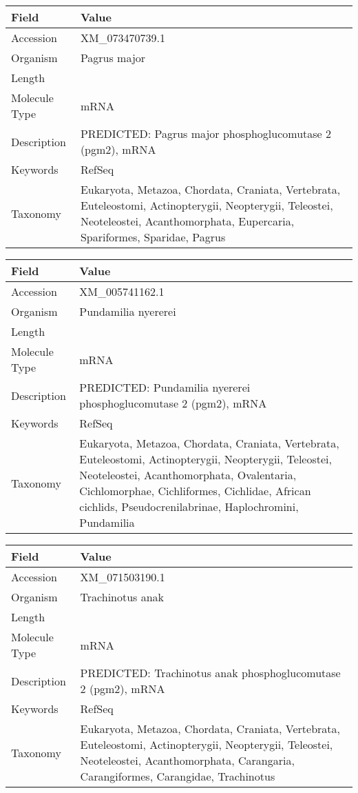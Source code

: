 \documentclass[10pt]{article}
\begin{document}
{\footnotesize
\begin{longtable}{>{\raggedright\arraybackslash}p{4.5cm} >{\raggedright\arraybackslash}p{11.5cm}}
\textbf{Field} & \textbf{Value} \\
\hline
Accession & XM\_073470739.1 \\
Organism & Pagrus major \\
Length & 2910 \\
Molecule Type & mRNA \\
Description & PREDICTED: Pagrus major phosphoglucomutase 2 (pgm2), mRNA \\
Keywords & RefSeq \\
Taxonomy & Eukaryota, Metazoa, Chordata, Craniata, Vertebrata, Euteleostomi, Actinopterygii, Neopterygii, Teleostei, Neoteleostei, Acanthomorphata, Eupercaria, Spariformes, Sparidae, Pagrus \\
\end{longtable}
}

{\footnotesize
\begin{longtable}{>{\raggedright\arraybackslash}p{4.5cm} >{\raggedright\arraybackslash}p{11.5cm}}
\textbf{Field} & \textbf{Value} \\
\hline
Accession & XM\_005741162.1 \\
Organism & Pundamilia nyererei \\
Length & 2559 \\
Molecule Type & mRNA \\
Description & PREDICTED: Pundamilia nyererei phosphoglucomutase 2 (pgm2), mRNA \\
Keywords & RefSeq \\
Taxonomy & Eukaryota, Metazoa, Chordata, Craniata, Vertebrata, Euteleostomi, Actinopterygii, Neopterygii, Teleostei, Neoteleostei, Acanthomorphata, Ovalentaria, Cichlomorphae, Cichliformes, Cichlidae, African cichlids, Pseudocrenilabrinae, Haplochromini, Pundamilia \\
\end{longtable}
}

{\footnotesize
\begin{longtable}{>{\raggedright\arraybackslash}p{4.5cm} >{\raggedright\arraybackslash}p{11.5cm}}
\textbf{Field} & \textbf{Value} \\
\hline
Accession & XM\_071503190.1 \\
Organism & Trachinotus anak \\
Length & 3036 \\
Molecule Type & mRNA \\
Description & PREDICTED: Trachinotus anak phosphoglucomutase 2 (pgm2), mRNA \\
Keywords & RefSeq \\
Taxonomy & Eukaryota, Metazoa, Chordata, Craniata, Vertebrata, Euteleostomi, Actinopterygii, Neopterygii, Teleostei, Neoteleostei, Acanthomorphata, Carangaria, Carangiformes, Carangidae, Trachinotus \\
\end{longtable}
}
\end{document}
